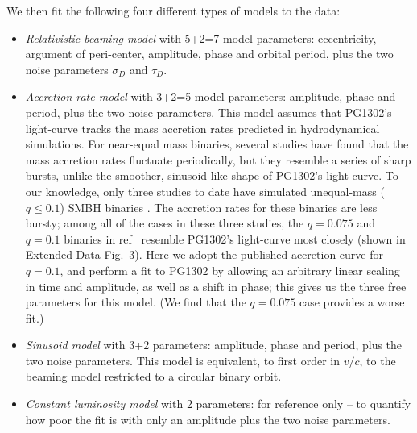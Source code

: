 We then fit the following four different types of models to the data:
%
\begin{itemize}
\item {\it Relativistic beaming model} with 5+2=7 model parameters:
  eccentricity, argument of peri-center, amplitude, phase and orbital
  period, plus the two noise parameters $\sigma_D$ and $\tau_D$.
\item {\it Accretion rate model} with 3+2=5 model parameters:
  amplitude, phase and period, plus the two noise parameters.  This
  model assumes that PG1302's light-curve tracks the mass accretion
  rates predicted in hydrodynamical simulations.  For near-equal mass
  binaries, several studies have found that the mass accretion rates
  fluctuate periodically, but they resemble a series of sharp bursts,
  unlike the smoother, sinusoid-like shape of PG1302's light-curve.
  To our knowledge, only three studies to date have simulated
  unequal-mass ($q\leq 0.1$) SMBH
  binaries \cite{DHM:2013:MNRAS,Farris:2014,ShiKrolik:2015}. The accretion
  rates for these binaries are less bursty; among all of the cases in
  these three studies, the $q=0.075$ and $q=0.1$ binaries in
  ref~\cite{DHM:2013:MNRAS} resemble PG1302's light-curve most closely
  (shown in Extended Data Fig.~3).  Here we adopt the published
  accretion curve for $q=0.1$, and perform a fit to PG1302 by
  allowing an arbitrary linear scaling in time and amplitude, as well
  as a shift in phase; this gives us the three free parameters for
  this model.  (We find that the $q=0.075$ case provides a worse fit.)
\item {\it Sinusoid model} with 3+2 parameters: amplitude, phase and
  period, plus the two noise parameters. This model is equivalent, to
  first order in $v/c$, to the beaming model restricted to a circular
  binary orbit.
\item {\it Constant luminosity model} with 2 parameters: for
  reference only -- to quantify how poor the fit is with only an
  amplitude plus the two noise parameters.

\end{itemize}
%

